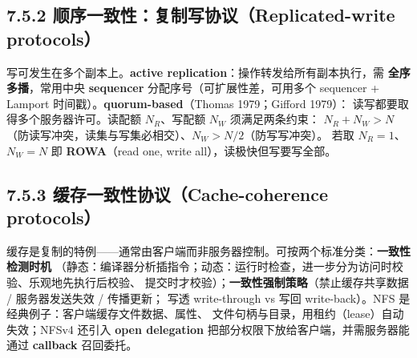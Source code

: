 \begin{closeread}
\end{closeread}


\subsection*{7.5.2 顺序一致性：复制写协议（Replicated-write protocols）}
写可发生在多个副本上。\textbf{active replication}：操作转发给所有副本执行，需
\textbf{全序多播}，常用中央 \textbf{sequencer} 分配序号（可扩展性差，可用多个
sequencer + Lamport 时间戳）。\textbf{quorum-based}（Thomas 1979；Gifford 1979）：
读写都要取得多个服务器许可。读配额 $N_R$、写配额 $N_W$ 须满足两条约束：
$N_R + N_W > N$（防读写冲突，读集与写集必相交）、$N_W > N/2$（防写写冲突）。
若取 $N_R = 1$、$N_W = N$ 即 \textbf{ROWA}（read one, write all），读极快但写要写全部。

\begin{closeread}
\end{closeread}


\subsection*{7.5.3 缓存一致性协议（Cache-coherence protocols）}
缓存是复制的特例——通常由客户端而非服务器控制。可按两个标准分类：\textbf{一致性检测时机}
（静态：编译器分析插指令；动态：运行时检查，进一步分为访问时校验、乐观地先执行后校验、
提交时才校验）；\textbf{一致性强制策略}（禁止缓存共享数据 / 服务器发送失效 / 传播更新；
写透 write-through vs 写回 write-back）。NFS 是经典例子：客户端缓存文件数据、属性、
文件句柄与目录，用租约（lease）自动失效；NFSv4 还引入 \textbf{open delegation}
把部分权限下放给客户端，并需服务器能通过 \textbf{callback} 召回委托。

\begin{closeread}
\end{closeread}

